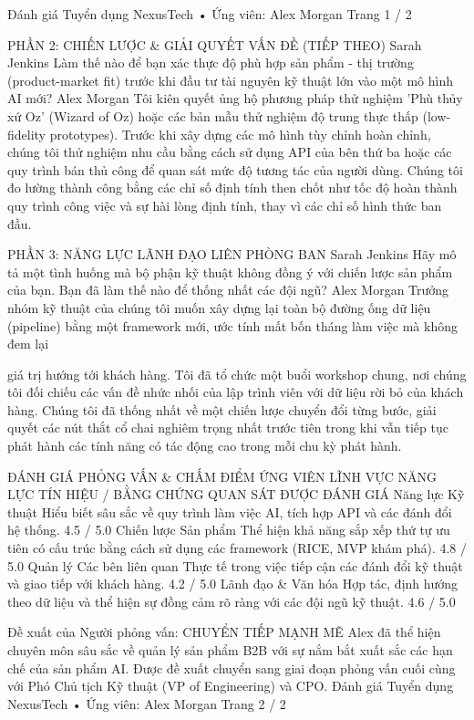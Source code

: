 \documentclass[12pt]{article}
\begin{document}
Đánh giá Tuyển dụng NexusTech • Ứng viên: Alex Morgan
Trang 1 / 2

PHẦN 2: CHIẾN LƯỢC \& GIẢI QUYẾT VẤN ĐỀ (TIẾP THEO)
Sarah Jenkins
Làm thế nào để bạn xác thực độ phù hợp sản phẩm - thị trường (product-market fit) trước khi đầu tư tài nguyên kỹ thuật lớn vào một mô hình AI mới?
Alex Morgan
Tôi kiên quyết ủng hộ phương pháp thử nghiệm 'Phù thủy xứ Oz' (Wizard of Oz) hoặc các bản mẫu thử nghiệm độ trung thực thấp (low-fidelity prototypes). Trước khi xây dựng các mô hình tùy chỉnh hoàn chỉnh, chúng tôi thử nghiệm nhu cầu bằng cách sử dụng API của bên thứ ba hoặc các quy trình bán thủ công để quan sát mức độ tương tác của người dùng. Chúng tôi đo lường thành công bằng các chỉ số định tính then chốt như tốc độ hoàn thành quy trình công việc và sự hài lòng định tính, thay vì các chỉ số hình thức ban đầu.

PHẦN 3: NĂNG LỰC LÃNH ĐẠO LIÊN PHÒNG BAN
Sarah Jenkins
Hãy mô tả một tình huống mà bộ phận kỹ thuật không đồng ý với chiến lược sản phẩm của bạn. Bạn đã làm thế nào để thống nhất các đội ngũ?
Alex Morgan
Trưởng nhóm kỹ thuật của chúng tôi muốn xây dựng lại toàn bộ đường ống dữ liệu (pipeline) bằng một framework mới, ước tính mất bốn tháng làm việc mà không đem lại

giá trị hướng tới khách hàng. Tôi đã tổ chức một buổi workshop chung, nơi chúng tôi đối chiếu các vấn đề nhức nhối của lập trình viên với dữ liệu rời bỏ của khách hàng. Chúng tôi đã thống nhất về một chiến lược chuyển đổi từng bước, giải quyết các nút thắt cổ chai nghiêm trọng nhất trước tiên trong khi vẫn tiếp tục phát hành các tính năng có tác động cao trong mỗi chu kỳ phát hành.

ĐÁNH GIÁ PHỎNG VẤN \& CHẤM ĐIỂM ỨNG VIÊN
LĨNH VỰC NĂNG LỰC
TÍN HIỆU / BẰNG CHỨNG QUAN SÁT ĐƯỢC
ĐÁNH GIÁ
Năng lực Kỹ thuật
Hiểu biết sâu sắc về quy trình làm việc AI, tích hợp API và các đánh đổi hệ thống.
4.5 /
5.0
Chiến lược Sản phẩm
Thể hiện khả năng sắp xếp thứ tự ưu tiên có cấu trúc bằng cách sử dụng các framework (RICE, MVP khám phá).
4.8 /
5.0
Quản lý Các bên liên quan
Thực tế trong việc tiếp cận các đánh đổi kỹ thuật và giao tiếp với khách hàng.
4.2 /
5.0
Lãnh đạo \& Văn hóa
Hợp tác, định hướng theo dữ liệu và thể hiện sự đồng cảm rõ ràng với các đội ngũ kỹ thuật.
4.6 /
5.0

Đề xuất của Người phỏng vấn: CHUYỂN TIẾP MẠNH MẼ
Alex đã thể hiện chuyên môn sâu sắc về quản lý sản phẩm B2B với sự nắm bắt xuất sắc các hạn chế của sản phẩm AI. Được đề xuất chuyển sang giai đoạn phỏng vấn cuối cùng với Phó Chủ tịch Kỹ thuật (VP of Engineering) và CPO.
Đánh giá Tuyển dụng NexusTech • Ứng viên: Alex Morgan
Trang 2 / 2
\end{document}
